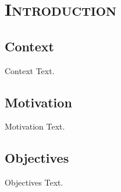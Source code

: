 \section{\scshape Introduction}\label{sec:introduction}

\subsection{Context}
\begin{frame}{Context}
	Text.
\end{frame}

\subsection{Motivation}
\begin{frame}{Motivation}
	Text.
\end{frame}


\subsection{Objectives}
\begin{frame}{Objectives}
	Text.
\end{frame}
